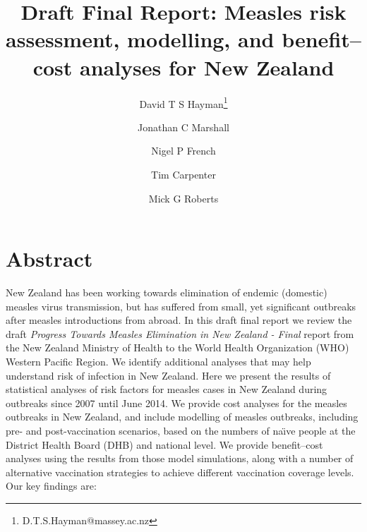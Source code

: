 \documentclass{article}
\begin{document}


\title{Draft Final Report: Measles risk assessment, modelling, and benefit--cost analyses for New Zealand}
\author[1]{David T S Hayman\thanks{D.T.S.Hayman@massey.ac.nz}}
\author[1] {Jonathan C Marshall}
\author[1] {Nigel P French}
\author[2] {Tim Carpenter}
\author[3] {Mick G Roberts}
\date{}
\maketitle

\section{Abstract}

New Zealand has been working towards elimination of endemic (domestic) measles virus transmission, but has suffered from small, yet significant outbreaks after measles introductions from abroad. In this draft final report we review the draft \emph {Progress Towards Measles Elimination in New Zealand - Final} report from the New Zealand Ministry of Health to the World Health Organization (WHO) Western Pacific Region. We identify additional analyses that may help understand risk of infection in New Zealand. Here we present the results of statistical analyses of risk factors for measles cases in New Zealand during outbreaks since 2007 until June 2014. We provide cost analyses for the measles outbreaks in New Zealand, and include modelling of measles outbreaks, including pre- and post-vaccination scenarios, based on the numbers of na\"{\i}ve people at the District Health Board (DHB) and national level. We provide benefit--cost analyses using the results from those model simulations, along with a number of alternative vaccination strategies to achieve different vaccination coverage levels. Our key findings are:
\end{document}
